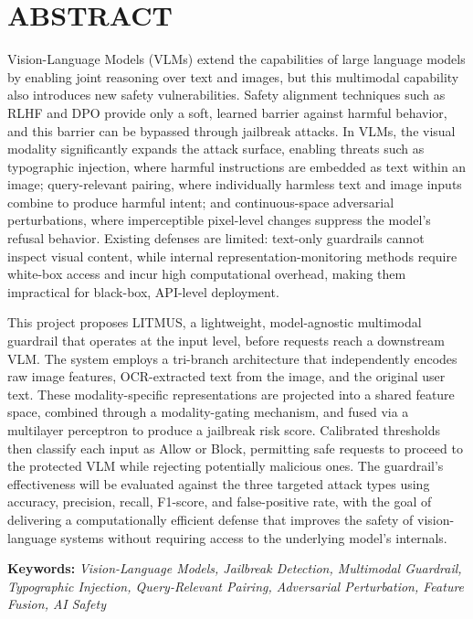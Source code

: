 \chapter*{ABSTRACT}

Vision-Language Models (VLMs) extend the capabilities of large language models by enabling joint reasoning over text and images, but this multimodal capability also introduces new safety vulnerabilities. Safety alignment techniques such as RLHF and DPO provide only a soft, learned barrier against harmful behavior, and this barrier can be bypassed through jailbreak attacks. In VLMs, the visual modality significantly expands the attack surface, enabling threats such as typographic injection, where harmful instructions are embedded as text within an image; query-relevant pairing, where individually harmless text and image inputs combine to produce harmful intent; and continuous-space adversarial perturbations, where imperceptible pixel-level changes suppress the model's refusal behavior. Existing defenses are limited: text-only guardrails cannot inspect visual content, while internal representation-monitoring methods require white-box access and incur high computational overhead, making them impractical for black-box, API-level deployment.

This project proposes LITMUS, a lightweight, model-agnostic multimodal guardrail that operates at the input level, before requests reach a downstream VLM. The system employs a tri-branch architecture that independently encodes raw image features, OCR-extracted text from the image, and the original user text. These modality-specific representations are projected into a shared feature space, combined through a modality-gating mechanism, and fused via a multilayer perceptron to produce a jailbreak risk score. Calibrated thresholds then classify each input as Allow or Block, permitting safe requests to proceed to the protected VLM while rejecting potentially malicious ones. The guardrail's effectiveness will be evaluated against the three targeted attack types using accuracy, precision, recall, F1-score, and false-positive rate, with the goal of delivering a computationally efficient defense that improves the safety of vision-language systems without requiring access to the underlying model's internals.

\textbf{Keywords: }\textit{
Vision-Language Models, Jailbreak Detection, Multimodal Guardrail, Typographic Injection, Query-Relevant Pairing, Adversarial Perturbation, Feature Fusion, AI Safety
}